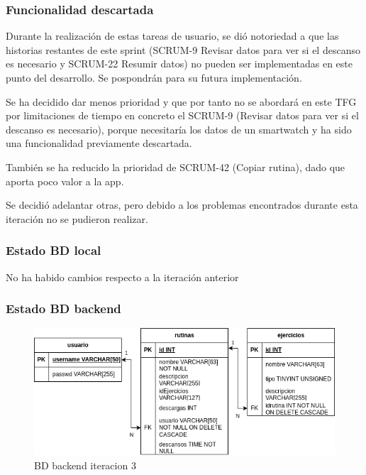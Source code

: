\subsubsection{Funcionalidad descartada}

Durante la realización de estas tareas de usuario, se dió notoriedad a que las historias restantes de este sprint (SCRUM-9 Revisar datos para ver si el descanso es necesario y SCRUM-22 Resumir datos) no pueden ser implementadas en este punto del desarrollo. Se pospondrán para su futura implementación.

Se ha decidido dar menos prioridad y que por tanto no se abordará en este TFG por limitaciones de tiempo en concreto el SCRUM-9 (Revisar datos para ver si el descanso es necesario), porque necesitaría los datos de un smartwatch y ha sido una funcionalidad previamente descartada.

También se ha reducido la prioridad de SCRUM-42 (Copiar rutina), dado que aporta poco valor a la app.

Se decidió adelantar otras, pero debido a los problemas encontrados durante esta iteración no se pudieron realizar.

\subsubsection{Estado BD local}

No ha habido cambios respecto a la iteración anterior

\subsubsection{Estado BD backend}

\begin{figure}[H]
   \centering
    \includegraphics[width=\textwidth]{fotos/BD be iteracion 3.png}
    \caption{BD backend iteracion 3}
    \label{fig:BD be iteracion 3}
\end{figure}


